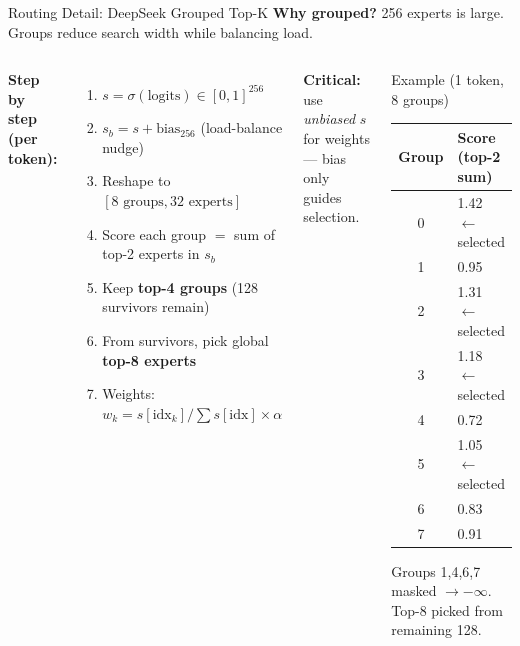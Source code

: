 \begin{frame}{Routing Detail: DeepSeek Grouped Top-K}
\small
\textbf{Why grouped?} 256 experts is large. Groups reduce search width while balancing load.

\medskip
\begin{columns}[T]
\textbf{Step by step (per token):}
\begin{enumerate}\small
  \item $s = \sigma(\text{logits}) \in [0,1]^{256}$
  \item $s_b = s + \text{bias}_{256}$ \quad(load-balance nudge)
  \item Reshape to $[8\text{ groups},32\text{ experts}]$
  \item Score each group $=$ sum of top-2 experts in $s_b$
  \item Keep \textbf{top-4 groups} (128 survivors remain)
  \item From survivors, pick global \textbf{top-8 experts}
  \item Weights: $w_k = s[\text{idx}_k] / \sum s[\text{idx}] \times \alpha$
\end{enumerate}
\smallskip
\textbf{Critical:} use \emph{unbiased} $s$ for weights --- bias only guides selection.

\begin{exampleblock}{\small Example (1 token, 8 groups)}
\scriptsize
\begin{tabular}{cl}
Group & Score (top-2 sum) \\
\hline
0 & 1.42 $\leftarrow$ selected \\
1 & 0.95 \\
2 & 1.31 $\leftarrow$ selected \\
3 & 1.18 $\leftarrow$ selected \\
4 & 0.72 \\
5 & 1.05 $\leftarrow$ selected \\
6 & 0.83 \\
7 & 0.91 \\
\end{tabular}
\vspace{2pt}

Groups 1,4,6,7 masked $\to -\infty$.\\
Top-8 picked from remaining 128.
\end{exampleblock}
\end{columns}
\end{frame}
